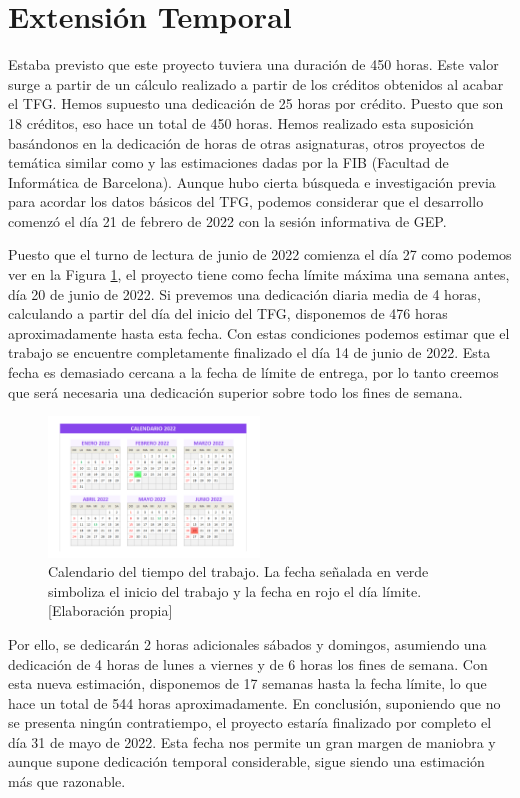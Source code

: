 \section{Extensión Temporal}
Estaba previsto que este proyecto tuviera una duración de 450 horas. Este valor surge a partir de un cálculo realizado a partir de los créditos obtenidos al acabar el TFG. Hemos supuesto una dedicación de 25 horas por crédito. Puesto que son 18 créditos, eso hace un total de 450 horas. Hemos realizado esta suposición basándonos en la dedicación de horas de otras asignaturas, otros proyectos de temática similar como \cite{wow-upc} \cite{netlogo} y las estimaciones dadas por la FIB (Facultad de Informática de Barcelona)\cite{fib_tfg}. Aunque hubo cierta búsqueda e investigación previa para acordar los datos básicos del TFG, podemos considerar que el desarrollo comenzó el día 21 de febrero de 2022 con la sesión informativa de GEP.   

Puesto que el turno de lectura de junio de 2022 comienza el día 27 \cite{fib_tfg} como podemos ver en la Figura \ref{fig:fechas}, el proyecto tiene como fecha límite máxima una semana antes, día 20 de junio de 2022. Si prevemos una dedicación diaria media de 4 horas, calculando a partir del día del inicio del TFG, disponemos de 476 horas aproximadamente hasta esta fecha. Con estas condiciones podemos estimar que el trabajo se encuentre completamente finalizado el día 14 de junio de 2022. Esta fecha es demasiado cercana a la fecha de límite de entrega, por lo tanto creemos que será necesaria una dedicación superior sobre todo los fines de semana.  
\begin{figure}[h]
    \centering
    \includegraphics[width=0.5\textwidth]{img/fechas.png}
    \caption{Calendario del tiempo del trabajo. La fecha señalada en verde simboliza el inicio del trabajo y la fecha en rojo el día límite. [Elaboración propia]}
    \label{fig:fechas}
\end{figure}

Por ello, se dedicarán 2 horas adicionales sábados y domingos, asumiendo una dedicación de 4 horas de lunes a viernes y de 6 horas los fines de semana. Con esta nueva estimación, disponemos de 17 semanas hasta la fecha límite, lo que hace un total de 544 horas aproximadamente. En conclusión, suponiendo que no se presenta ningún contratiempo, el proyecto estaría finalizado por completo el día 31 de mayo de 2022. Esta fecha nos permite un gran margen de maniobra y aunque supone dedicación temporal considerable, sigue siendo una estimación más que razonable.


